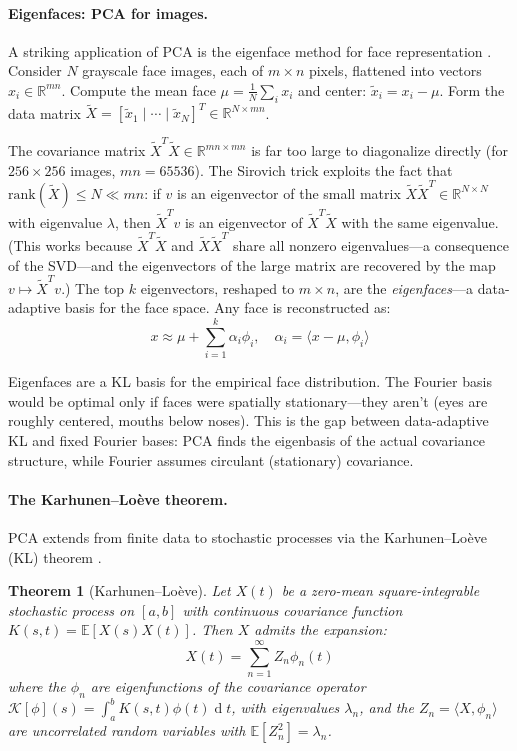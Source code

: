 \documentclass[12pt,a4paper]{report}
\DeclareMathOperator{\deriv}{d}
\theoremstyle{thms}
\newtheorem{theorem}{Theorem}[section]
\theoremstyle{defns}
\begin{document}
\paragraph{Eigenfaces: PCA for images.} A striking application of PCA is the eigenface method for face representation \cite{turk_pentland}. Consider $N$ grayscale face images, each of $m \times n$ pixels, flattened into vectors $x_i \in \mathbb{R}^{mn}$. Compute the mean face $\mu = \frac{1}{N}\sum_{i} x_i$ and center: $\tilde{x}_i = x_i - \mu$. Form the data matrix $\tilde{X} = [\tilde{x}_1 \mid \cdots \mid \tilde{x}_N]^T \in \mathbb{R}^{N \times mn}$.

The covariance matrix $\tilde{X}^T\tilde{X} \in \mathbb{R}^{mn \times mn}$ is far too large to diagonalize directly (for $256 \times 256$ images, $mn = 65536$). The Sirovich trick \cite{sirovich_kirby} exploits the fact that $\mathrm{rank}(\tilde{X}) \leq N \ll mn$: if $v$ is an eigenvector of the small matrix $\tilde{X}\tilde{X}^T \in \mathbb{R}^{N \times N}$ with eigenvalue $\lambda$, then $\tilde{X}^Tv$ is an eigenvector of $\tilde{X}^T\tilde{X}$ with the same eigenvalue. (This works because $\tilde{X}^T\tilde{X}$ and $\tilde{X}\tilde{X}^T$ share all nonzero eigenvalues—a consequence of the SVD—and the eigenvectors of the large matrix are recovered by the map $v \mapsto \tilde{X}^Tv$.) The top $k$ eigenvectors, reshaped to $m \times n$, are the \textit{eigenfaces}—a data-adaptive basis for the face space. Any face is reconstructed as:
\begin{equation}
    x \approx \mu + \sum_{i=1}^{k} \alpha_i \phi_i, \quad \alpha_i = \langle x - \mu, \phi_i \rangle
\end{equation}

Eigenfaces are a KL basis for the empirical face distribution. The Fourier basis would be optimal only if faces were spatially stationary—they aren't (eyes are roughly centered, mouths below noses). This is the gap between data-adaptive KL and fixed Fourier bases: PCA finds the eigenbasis of the actual covariance structure, while Fourier assumes circulant (stationary) covariance.

\paragraph{The Karhunen--Lo\`{e}ve theorem.} PCA extends from finite data to stochastic processes via the Karhunen--Lo\`{e}ve (KL) theorem \cite{karhunen_loeve}.

\begin{theorem}[Karhunen--Lo\`{e}ve]
    Let $X(t)$ be a zero-mean square-integrable stochastic process on $[a, b]$ with continuous covariance function $K(s, t) = \mathbb{E}[X(s)X(t)]$. Then $X$ admits the expansion:
    \begin{equation}
        X(t) = \sum_{n=1}^{\infty} Z_n \phi_n(t)
    \end{equation}
    where the $\phi_n$ are eigenfunctions of the covariance operator $\mathcal{K}[\phi](s) = \int_a^b K(s, t)\phi(t)\deriv{t}$, with eigenvalues $\lambda_n$, and the $Z_n = \langle X, \phi_n \rangle$ are uncorrelated random variables with $\mathbb{E}[Z_n^2] = \lambda_n$.
\end{theorem}
\end{document}
